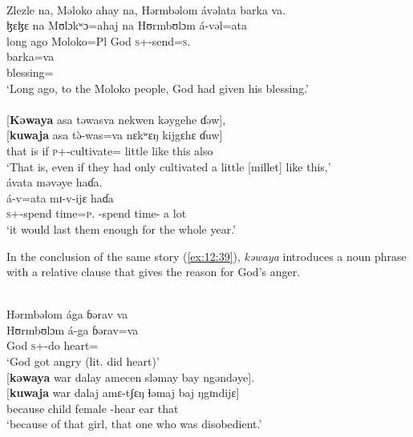 \clearpage
\largerpage
\ea \label{ex:12:38}\\
Zlezle na, Məloko ahay na, Hərmbəlom ávəlata barka va.\\ 
\gll  ɮɛɮɛ na Mʊlɔkʷɔ=ahaj na Hʊrmbʊlɔm á-vəl=ata \\ 
     {long ago} {\PSP} Moloko=Pl  {\PSP} God \textsc{s}+{\IFV}-send=\textsc{s}.{\IO}   \\   
      
      \medskip
\gll barka=va\\
     blessing={\PRF}\\
\glt ‘Long ago, to the Moloko people, God had given his blessing.’\\

\medskip{}\\\relax
{}[\textbf{Kəwaya} asa  təwasva  nekwen  kəygehe  ɗəw],\\  
\gll {}[\textbf{kuwaja} asa t\`{ə}-was=va nɛkʷɛŋ kijgɛhɛ ɗuw]\\ 
     {that is}  if \textsc{p}+{\PFV}-cultivate={\PRF} little {like this} also\\ 
\glt ‘That is, even if they had only cultivated a little [millet] like this,’\\

\medskip
ávata  məvəye  haɗa.\\
\gll á-v=ata mɪ-v-ijɛ haɗa\\
    \textsc{s}+{\IFV}-{spend time}=\textsc{p}.{\IO} {\NOM}{}-{spend time}-{\CL} {a lot}\\
\glt  ‘it would last them enough for the whole year.’
\z  

In the conclusion of the same story (\ref{ex:12:39}), \textit{kəwaya} introduces a noun phrase with a relative clause that gives the reason for God’s anger.

\ea \label{ex:12:39}
\\
Hərmbəlom  ága  ɓərav  va\\  
\gll  Hʊrmbʊlɔm   á-ga  ɓərav=va \\   
      God    \textsc{s}+{\IFV}-do    heart={\PRF} \\
\glt ‘God got angry (lit. did heart)’\\      
      
      \medskip
{}[\textbf{kəwaya}  war  dalay  amecen  sləmay  bay  ngəndəye].\\      
\gll {}[\textbf{kuwaja} war dalaj amɛ-tʃɛŋ ɬəmaj baj ŋgɪndijɛ] \\
     because  child  female  {\DEP}-hear  ear  {\NEG}  that\\
\glt  ‘because of that girl, that one who was disobedient.’
\z 

